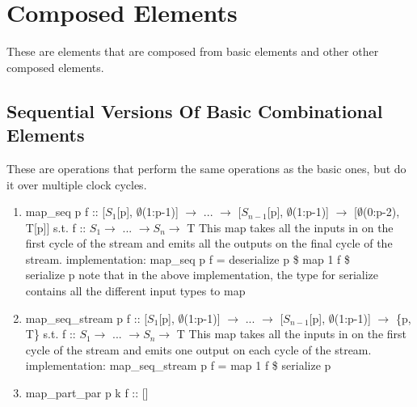 \documentclass[11pt,fleqn]{article}
\numberwithin{equation}{subsection}
\begin{document}
\section{Composed Elements}
These are elements that are composed from basic elements and other other composed
elements.

\subsection{Sequential Versions Of Basic Combinational Elements}
These are operations that perform the same operations as the basic ones, but
do it over multiple clock cycles.
\begin{enumerate}
    \item map\_seq p f :: [$S_1$[p], $\emptyset$(1:p-1)] $\rightarrow$ ...
        $\rightarrow$ [$S_{n-1}$[p], $\emptyset$(1:p-1)] $\rightarrow$
        [$\emptyset$(0:p-2), T[p]]
        \subitem s.t. f :: $S_1 \rightarrow$ ... $\rightarrow S_n \rightarrow$ T
        \subitem This map takes all the inputs in on the first cycle of the 
        stream and emits all the outputs on the final cycle of the stream.
        \subitem implementation: map\_seq p f = deserialize p \$ map 1 f \$ \\ serialize p
        \subitem note that in the above implementation, the type for serialize 
        contains all the different input types to map
    \item map\_seq\_stream p f :: [$S_1$[p], $\emptyset$(1:p-1)] $\rightarrow$ ...
        $\rightarrow$ [$S_{n-1}$[p], $\emptyset$(1:p-1)] $\rightarrow$
        \{p, T\}
        \subitem s.t. f :: $S_1 \rightarrow$ ... $\rightarrow S_n \rightarrow$ T
        \subitem This map takes all the inputs in on the first cycle of the 
        stream and emits one output on each cycle of the stream.
        \subitem implementation: map\_seq\_stream p f = map 1 f \$ serialize p
    \item map\_part\_par p k f :: []
\end{enumerate}
\end{document}
